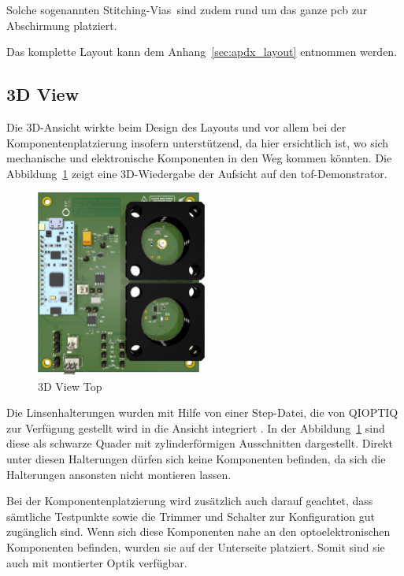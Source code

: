 Solche sogenannten \dq Stitching-Vias\dq\ sind zudem rund um das ganze \acrshort{pcb} zur Abschirmung platziert.

Das komplette Layout kann dem Anhang~\ref{sec:apdx_layout} entnommen werden.

\pagebreak

\subsection{3D View}
Die 3D-Ansicht wirkte beim Design des Layouts und vor allem bei der Komponentenplatzierung insofern unterstützend, da hier
ersichtlich ist, wo sich mechanische und elektronische Komponenten in den Weg kommen könnten. Die Abbildung~\ref{fig:3d_top}
zeigt eine 3D-Wiedergabe der Aufsicht auf den \acrshort{tof}-Demonstrator.

\begin{figure}[H]
    \centering
    \includegraphics[width=0.5\textwidth]{graphics/3d_top.png}
    \caption{3D View Top}\label{fig:3d_top}
\end{figure}

Die Linsenhalterungen wurden mit Hilfe von einer Step-Datei, die von QIOPTIQ zur Verfügung gestellt wird in die Ansicht
integriert \cite{qioptiq2024g061041000_shoppage}. In der Abbildung~\ref{fig:3d_top} sind diese als schwarze Quader mit
zylinderförmigen Ausschnitten dargestellt. Direkt unter diesen Halterungen dürfen sich keine Komponenten befinden, da
sich die Halterungen ansonsten nicht montieren lassen.

Bei der Komponentenplatzierung wird zusätzlich auch darauf geachtet, dass sämtliche Testpunkte sowie die Trimmer und
Schalter zur Konfiguration gut zugänglich sind. Wenn sich diese Komponenten nahe an den optoelektronischen Komponenten
befinden, wurden sie auf der Unterseite platziert. Somit sind sie auch mit montierter Optik verfügbar.

